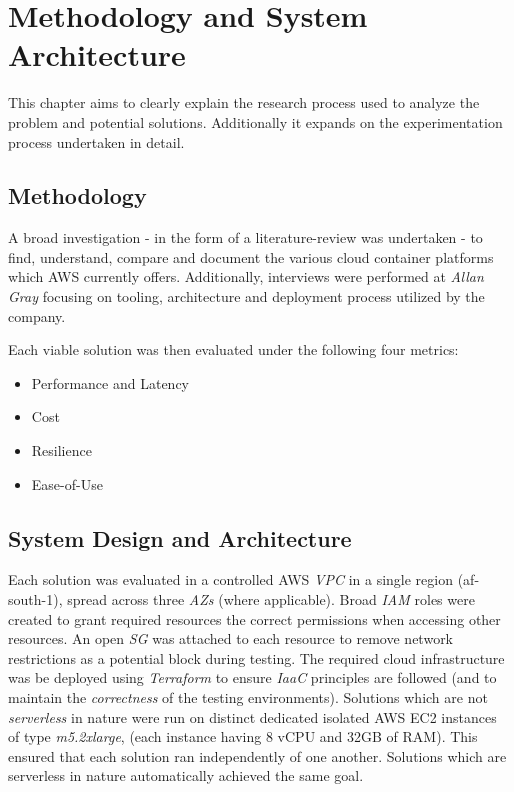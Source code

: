 \part{Methodology and System Architecture}
\label{sec:method}

This chapter aims to clearly explain the research process used to analyze the problem and potential solutions.
Additionally it expands on the experimentation process undertaken in detail.

\chapter{Methodology}
A broad investigation - in the form of a literature-review was undertaken - to find, understand, compare and document the various cloud container platforms which AWS currently offers.
Additionally, interviews were performed at \emph{Allan Gray} focusing on tooling, architecture and deployment process utilized by the company.

\noindent \newline Each viable solution was then evaluated under the following four metrics:
\begin{itemize}
  \item Performance and Latency
  \item Cost
  \item Resilience
  \item Ease-of-Use
\end{itemize}

\chapter{System Design and Architecture}

Each solution was evaluated in a controlled AWS \emph{VPC} in a single region (af-south-1), spread across three \emph{AZs} (where applicable).
Broad \textit{IAM} roles were created to grant required resources the correct permissions when accessing other resources.
An open \textit{SG} was attached to each resource to remove network restrictions as a potential block during testing.
The required cloud infrastructure was be deployed using \emph{Terraform} to ensure \emph{IaaC} principles are followed (and to maintain the \emph{correctness} of the testing environments).
Solutions which are not \emph{serverless} in nature were run on distinct dedicated isolated AWS EC2 instances of type \emph{m5.2xlarge}\cite{m5}, (each instance having 8 vCPU and 32GB of RAM). This ensured that each solution ran independently of one another.
Solutions which are serverless in nature automatically achieved the same goal.

